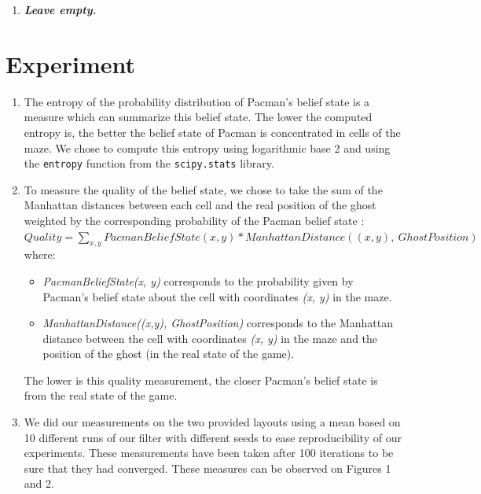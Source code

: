 \documentclass{article}
\begin{document}
\begin{enumerate}[label=\alph*.,leftmargin=*]
    \item \textbf{\textit{Leave empty.}}
\end{enumerate}

\section{Experiment}

\begin{enumerate}[label=\alph*.,leftmargin=*]
    \item The entropy of the probability distribution of Pacman's belief state is a measure which can summarize this belief state. 
    The lower the computed entropy is, the better the belief state of Pacman is concentrated in cells of the maze. We chose to compute this entropy using logarithmic base 2 and using the \texttt{entropy} function from the \texttt{scipy.stats} library.
    
    \item To measure the quality of the belief state, we chose to take the sum of the Manhattan distances between each cell and the real position of the ghost weighted by the corresponding probability of the Pacman belief state :\\
    
    $Quality = {\sum_{x, y} {PacmanBeliefState(x, y) * ManhattanDistance((x, y), \ GhostPosition)}}$\\

    where:
    \begin{itemize}
    	\item \textit{PacmanBeliefState(x, y)} corresponds to the probability given by Pacman's belief state about the cell with coordinates \textit{(x, y)} in the maze.
    	\item \textit{ManhattanDistance((x,y), GhostPosition)} corresponds to the Manhattan distance between the cell with coordinates \textit{(x, y)} in the maze and the position of the ghost (in the real state of the game).
	\end{itemize}        
     The lower is this quality measurement, the closer Pacman's belief state is from the real state of the game.
    \item We did our measurements on the two provided layouts using a mean based on 10 different runs of our filter with different seeds to ease reproducibility of our experiments. These measurements have been taken after 100 iterations to be sure that they had converged.
    These measures can be observed on Figures 1 and 2. 


\end{enumerate}
\end{document}
